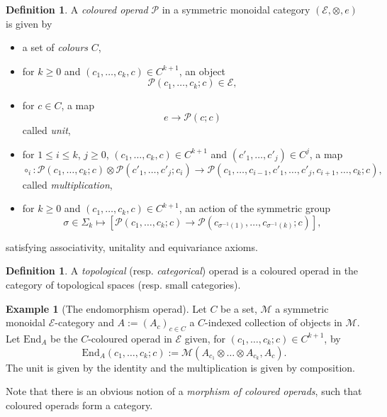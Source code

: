 \documentclass[]{amsart}
\theoremstyle{definition}
\newtheorem{definition}[theorem]{Definition}
\newtheorem{example}[theorem]{Example}
\begin{document}
\begin{definition}
	A \emph{coloured operad} $\mathcal{P}$ in a symmetric monoidal category $(\mathcal{E},\otimes,e)$ is given by
	\begin{itemize}
		\item a set of \emph{colours} $C$,
		\item for $k \geq 0$ and $(c_1,\ldots,c_k,c) \in C^{k+1}$, an object
		\[
			\mathcal{P}(c_1,\ldots,c_k;c) \in \mathcal{E},
		\]
		\item for $c \in C$, a map
		\[
			e \to \mathcal{P}(c;c)
		\]
		called \emph{unit},
		\item for $1 \leq i \leq k$, $j \geq 0$, $(c_1,\ldots,c_k,c) \in C^{k+1}$ and $(c'_1,\ldots,c'_j) \in C^j$, a map
		\begin{equation}\label{compositionmap}
			\circ_i: \mathcal{P}(c_1,\ldots,c_k;c) \otimes \mathcal{P}(c'_1,\ldots,c'_j;c_i) \to \mathcal{P}(c_1,\ldots,c_{i-1},c'_1,\ldots,c'_j,c_{i+1},\ldots,c_k;c),
		\end{equation}
		called \emph{multiplication},
		\item for $k \geq 0$ and $(c_1,\ldots,c_k,c) \in C^{k+1}$, an action of the symmetric group
		\[
		\sigma \in \Sigma_k \mapsto \left[\mathcal{P}(c_1,\ldots,c_k;c) \to \mathcal{P}(c_{\sigma^{-1}(1)},\ldots,c_{\sigma^{-1}(k)};c)\right],
		\]
	\end{itemize}
	satisfying associativity, unitality and equivariance axioms.
\end{definition}


\begin{definition}
	A \emph{topological} (resp. \emph{categorical}) operad is a coloured operad in the category of topological spaces (resp. small categories).
\end{definition}

\begin{example}[The endomorphism operad]\label{exampleendomorphismoperad}
	Let $C$ be a set, $\mathcal{M}$ a symmetric monoidal $\mathcal{E}$-category and $A := (A_c)_{c \in C}$ a $C$-indexed collection of objects in $\mathcal{M}$. Let $\mathrm{End}_A$ be the $C$-coloured operad in $\mathcal{E}$ given, for $(c_1,\ldots,c_k;c) \in C^{k+1}$, by
	\[
		\mathrm{End}_A(c_1,\ldots,c_k;c) := \mathcal{M}(A_{c_1} \otimes \ldots \otimes A_{c_k},A_c).
	\]
	The unit is given by the identity and the multiplication is given by composition.
\end{example}

Note that there is an obvious notion of a \emph{morphism of coloured operads}, such that coloured operads form a category.
\end{document}
